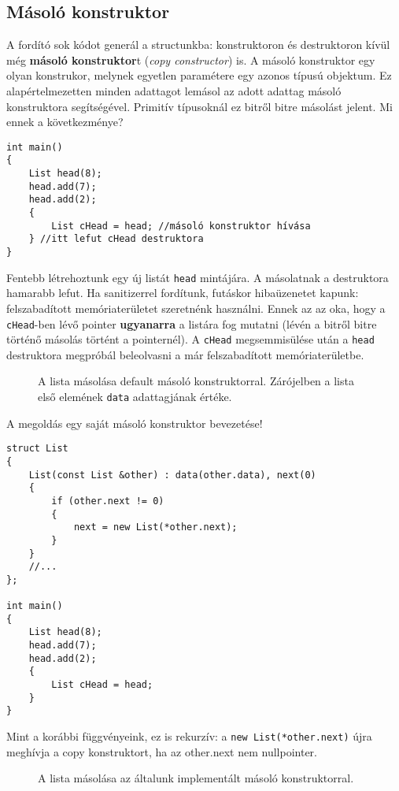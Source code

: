 \documentclass[../cpp_book/cpp_book.tex]{subfiles}
\begin{document}
	\subsection{Másoló konstruktor}
	
	A fordító sok kódot generál a structunkba: konstruktoron és destruktoron kívül még \textbf{másoló konstruktor}t (\textit{copy constructor}) is. A másoló konstruktor egy olyan konstrukor, melynek egyetlen paramétere egy azonos típusú objektum. Ez alapértelmezetten minden adattagot lemásol az adott adattag másoló konstruktora segítségével. Primitív típusoknál ez bitről bitre másolást jelent. Mi ennek a következménye?
	\begin{lstlisting}
int main()
{
	List head(8);
	head.add(7);
	head.add(2);
	{
		List cHead = head; //másoló konstruktor hívása
	} //itt lefut cHead destruktora
}
	\end{lstlisting}
	Fentebb létrehoztunk egy új listát \texttt{head} mintájára. A másolatnak a destruktora hamarabb lefut. Ha sanitizerrel fordítunk, futáskor hibaüzenetet kapunk: felszabadított memóriaterületet szeretnénk használni. Ennek az az oka, hogy a \texttt{cHead}-ben lévő pointer \textbf{ugyanarra} a listára fog mutatni (lévén a bitről bitre történő másolás történt a pointernél). A \texttt{cHead} megsemmisülése után a \texttt{head} destruktora megpróbál beleolvasni a már felszabadított memóriaterületbe.
	
	\begin{figure}[!h]
		\centering
		
		
		\caption{A lista másolása default másoló konstruktorral. Zárójelben a lista első elemének \texttt{data} adattagjának értéke.}\label{fig_list_copy_ctor_wrong}
	\end{figure}
	
	A megoldás egy saját másoló konstruktor bevezetése!
	
	
\begin{lstlisting}
struct List
{
	List(const List &other) : data(other.data), next(0)
	{
		if (other.next != 0)
		{
			next = new List(*other.next);
		}
	}
	//...
};

int main()
{
	List head(8);
	head.add(7);
	head.add(2);
	{
		List cHead = head;
	}
}
\end{lstlisting}
	Mint a korábbi függvényeink, ez is rekurzív: a \texttt{new List(*other.next)} újra meghívja a copy konstruktort, ha az other.next nem nullpointer.
	\begin{figure}[!h]
		\centering
		
		\caption{A lista másolása az általunk implementált másoló konstruktorral.}\label{fig_list_copy_ctor_correct}
	\end{figure}
	
\end{document}
